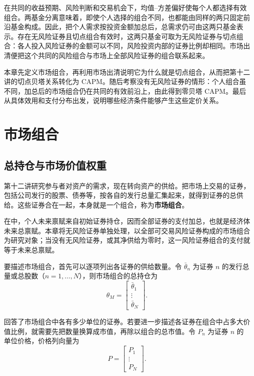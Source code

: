 在共同的收益预期、风险判断和交易机会下，均值--方差偏好使每个人都选择有效组合。两基金分离意味着，即使个人选择的组合不同，也都能由同样的两只固定前沿基金构成。因此，把个人需求按投资金额加总后，总需求仍可由这两只基金表示。存在无风险证券且切点组合有效时，这两只基金可取为无风险证券与切点组合：各人投入风险证券的金额可以不同，风险投资内部的证券比例却相同。市场出清便把这个共同的风险组合与市场上全部风险证券的组合联系起来。

本章先定义市场组合，再利用市场出清说明它为什么就是切点组合，从而把第十二讲的切点贝塔关系转化为 CAPM。随后考察没有无风险证券的情形：个人组合虽不同，加总后的市场组合仍在共同的有效前沿上，由此得到零贝塔 CAPM。最后从具体效用和支付分布出发，说明哪些经济条件能够产生这些定价关系。

\section{市场组合}\label{sec:wj-thirteen-1}
\subsection{总持仓与市场价值权重}
第十二讲研究参与者对资产的需求，现在转向资产的供给。把市场上交易的证券，包括公司发行的股票、债券等，按各自的发行总量汇集起来，就得到证券的总供给。这些证券合在一起，本身就是一个组合，称为\textbf{市场组合}。

在中，个人未来禀赋来自初始证券持仓，因而全部证券的支付加总，也就是经济体未来总禀赋。本章将无风险证券单独处理，以全部可交易风险证券构成的市场组合为研究对象；当没有无风险证券，或其净供给为零时，这一风险证券组合的支付就等于未来总禀赋。

要描述市场组合，首先可以逐项列出各证券的供给数量。令 $\bar\theta_n$ 为证券 $n$ 的发行总量或总股数（$n=1,\ldots,N$），则市场组合的总持仓为
\begin{equation}
 \theta_M=\begin{bmatrix}\bar\theta_1\\\vdots\\\bar\theta_N\end{bmatrix}.
 \label{eq:wj-13-1}
\end{equation}

回答了市场组合中各有多少单位的证券。若要进一步描述各证券在组合中占多大价值比例，就需要先把数量换算成市值，再除以组合的总市值。令 $P_n$ 为证券 $n$ 的单位价格，价格列向量为
\[
 P=\begin{bmatrix}P_1\\\vdots\\P_N\end{bmatrix}.
\]

